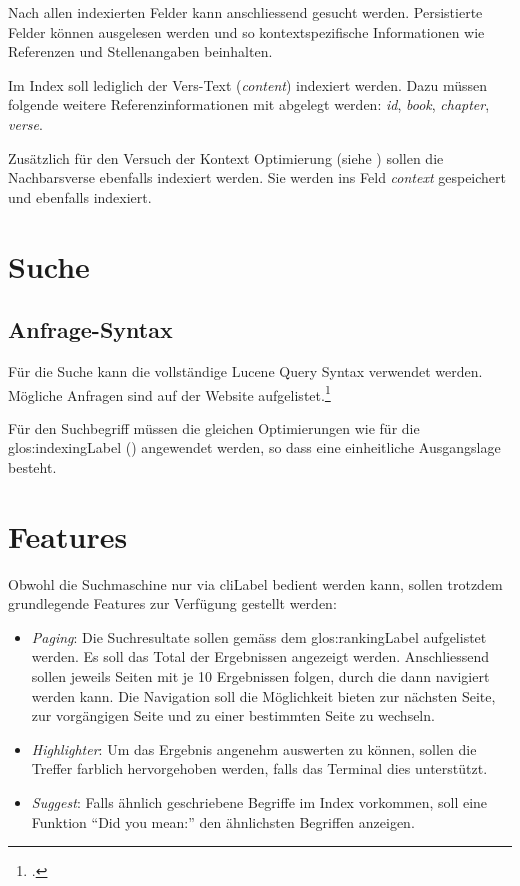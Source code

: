 Nach allen indexierten Felder kann anschliessend gesucht werden. Persistierte Felder können ausgelesen werden und so kontextspezifische Informationen wie Referenzen und Stellenangaben beinhalten.

Im Index soll lediglich der Vers-Text (\textit{content}) indexiert werden.
Dazu müssen folgende weitere Referenzinformationen mit abgelegt werden: \textit{id}, \textit{book}, \textit{chapter}, \textit{verse}.

Zusätzlich für den Versuch der Kontext Optimierung (siehe ) sollen die Nachbarsverse ebenfalls indexiert werden. Sie werden ins Feld \textit{context} gespeichert und ebenfalls indexiert.


\section{Suche}
\subsection{Anfrage-Syntax}
Für die Suche kann die vollständige Lucene Query Syntax verwendet werden. Mögliche Anfragen sind auf der Website aufgelistet.\footcite{Lucene_Query_Syntax_Lucene_Tutorial_2016-05-09}

Für den Suchbegriff müssen die gleichen Optimierungen wie für die \gls{glos:indexingLabel} () angewendet werden, so dass eine einheitliche Ausgangslage besteht.

\section{Features}
Obwohl die Suchmaschine nur via \gls{cliLabel} bedient werden kann, sollen trotzdem grundlegende Features zur Verfügung gestellt werden:
\begin{itemize}[noitemsep]
	\item \textit{Paging}:
	Die Suchresultate sollen gemäss dem \gls{glos:rankingLabel} aufgelistet werden. Es soll das Total der Ergebnissen angezeigt werden. Anschliessend sollen jeweils Seiten mit je 10 Ergebnissen folgen, durch die dann navigiert werden kann.
	Die Navigation soll die Möglichkeit bieten zur nächsten Seite, zur vorgängigen Seite und zu einer bestimmten Seite zu wechseln.
	
	\item \textit{Highlighter}:
	Um das Ergebnis angenehm auswerten zu können, sollen die Treffer farblich hervorgehoben werden, falls das Terminal dies unterstützt.

	\item \textit{Suggest}:
	Falls ähnlich geschriebene Begriffe im Index vorkommen, soll eine Funktion "`Did you mean:"' den ähnlichsten Begriffen anzeigen.
	
	
\end{itemize}

